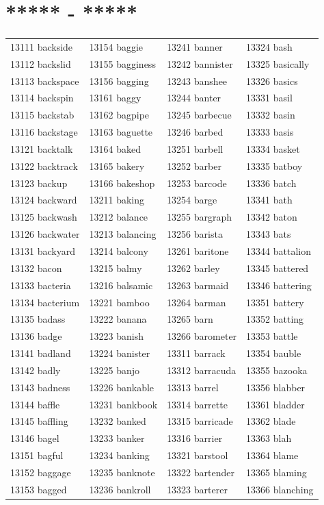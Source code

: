 \documentclass[10pt, oneside]{book}
\begin{document}
\begin{table}
	\centering
	\section*{***** - *****}
	\begin{tabular}{l l l l}
13111 backside &13154 baggie &13241 banner &13324 bash\\
13112 backslid &13155 bagginess &13242 bannister &13325 basically\\
13113 backspace &13156 bagging &13243 banshee &13326 basics\\
13114 backspin &13161 baggy &13244 banter &13331 basil\\
13115 backstab &13162 bagpipe &13245 barbecue &13332 basin\\
13116 backstage &13163 baguette &13246 barbed &13333 basis\\
13121 backtalk &13164 baked &13251 barbell &13334 basket\\
13122 backtrack &13165 bakery &13252 barber &13335 batboy\\
13123 backup &13166 bakeshop &13253 barcode &13336 batch\\
13124 backward &13211 baking &13254 barge &13341 bath\\
13125 backwash &13212 balance &13255 bargraph &13342 baton\\
13126 backwater &13213 balancing &13256 barista &13343 bats\\
13131 backyard &13214 balcony &13261 baritone &13344 battalion\\
13132 bacon &13215 balmy &13262 barley &13345 battered\\
13133 bacteria &13216 balsamic &13263 barmaid &13346 battering\\
13134 bacterium &13221 bamboo &13264 barman &13351 battery\\
13135 badass &13222 banana &13265 barn &13352 batting\\
13136 badge &13223 banish &13266 barometer &13353 battle\\
13141 badland &13224 banister &13311 barrack &13354 bauble\\
13142 badly &13225 banjo &13312 barracuda &13355 bazooka\\
13143 badness &13226 bankable &13313 barrel &13356 blabber\\
13144 baffle &13231 bankbook &13314 barrette &13361 bladder\\
13145 baffling &13232 banked &13315 barricade &13362 blade\\
13146 bagel &13233 banker &13316 barrier &13363 blah\\
13151 bagful &13234 banking &13321 barstool &13364 blame\\
13152 baggage &13235 banknote &13322 bartender &13365 blaming\\
13153 bagged &13236 bankroll &13323 barterer &13366 blanching\\
	\end{tabular}
 \end{table}
\end{document}
